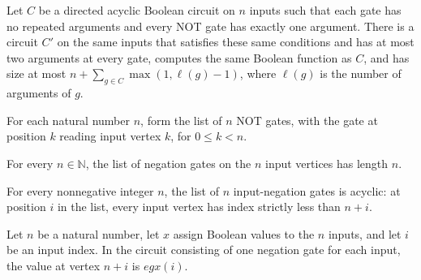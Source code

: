 \begin{theorem}
\label{BoolCircuit.DAGCircuit.exists_faninTwo_size_le_sum}
\leanok
{}
Let $C$ be a directed acyclic Boolean circuit on $n$ inputs such that each gate has no
repeated arguments and every NOT gate has exactly one argument. There is a circuit $C'$
on the same inputs that satisfies these same conditions and has at most two arguments at
every gate, computes the same Boolean function as $C$, and has size at most
$n+\sum_{g\in C}\max(1,\ell(g)-1)$, where $\ell(g)$ is the number of arguments of $g$.
\end{theorem}

\begin{definition}
\label{BoolCircuit.negInputGates}
\leanok
{}
For each natural number $n$, form the list of $n$ NOT gates, with the gate at position
$k$ reading input vertex $k$, for $0 \le k < n$.
\end{definition}

\begin{theorem}
\label{BoolCircuit.length_negInputGates}
\leanok
{}
For every $n\in\mathbb{N}$, the list of negation gates on the $n$ input vertices has
length $n$.
\end{theorem}

\begin{theorem}
\label{BoolCircuit.negInputGates_acyclic}
\leanok
{}
For every nonnegative integer $n$, the list of $n$ input-negation gates is acyclic: at
position $i$ in the list, every input vertex has index strictly less than $n+i$.
\end{theorem}

\begin{theorem}
\label{BoolCircuit.vertexValue_negInputGates}
\leanok
{}
Let $n$ be a natural number, let $x$ assign Boolean values to the $n$ inputs, and let
$i$ be an input index. In the circuit consisting of one negation gate for each input,
the value at vertex $n+i$ is $
eg x(i)$.
\end{theorem}

